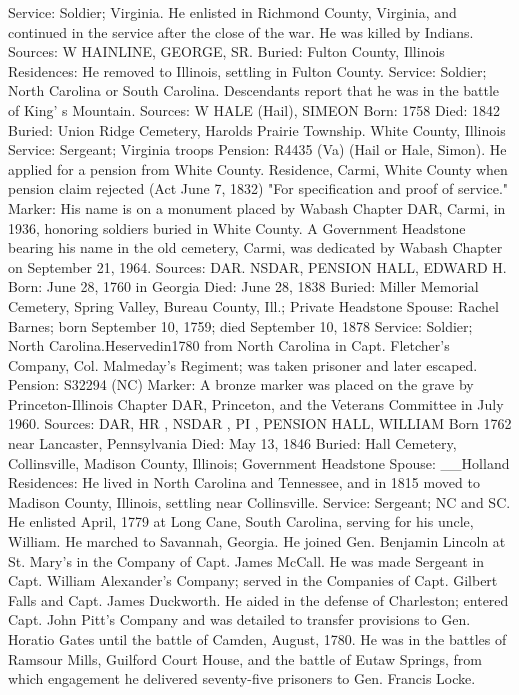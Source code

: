 Service: Soldier; Virginia. He enlisted in Richmond County, Virginia, and continued in the service after the close of the war. He was killed by Indians. 
Sources: W 
HAINLINE, GEORGE, SR. 
Buried: Fulton County, Illinois 
Residences: He removed to Illinois, settling in Fulton County. 
Service: Soldier; North Carolina or South Carolina. Descendants report that he was in the battle of King' s Mountain. 
Sources: W 
HALE (Hail), SIMEON 
Born: 1758 
Died: 1842 
Buried: Union Ridge Cemetery, Harolds Prairie Township. White County, Illinois 
Service: Sergeant; Virginia troops Pension: R4435 (Va) (Hail or Hale, Simon). He applied for a pension from White County. 
Residence, Carmi, White County when pension claim rejected (Act June 7, 1832) "For specification and proof of service." 
Marker: His name is on a monument placed by Wabash Chapter DAR, Carmi, in 1936, honoring soldiers buried in White County. A Government Headstone bearing his name in the old cemetery, Carmi, was dedicated by Wabash Chapter on September 21, 1964. 
Sources: DAR. NSDAR, PENSION 
HALL, EDWARD H. 
Born: June 28, 1760 in Georgia 
Died: June 28, 1838 
Buried: Miller Memorial Cemetery, Spring Valley, Bureau County, Ill.; Private Headstone 
Spouse: Rachel Barnes; born September 10, 1759; died September 10, 1878 
Service: Soldier; North Carolina.Heservedin1780 from North Carolina in Capt. Fletcher's Company, Col. Malmeday's Regiment; was taken prisoner and later escaped. 
Pension: S32294 (NC) 
Marker: A bronze marker was placed on the grave by Princeton-Illinois Chapter DAR, Princeton, and the Veterans Committee in July 1960. 
Sources: DAR, HR , NSDAR , PI , PENSION 
HALL, WILLIAM 
Born 1762 near Lancaster, Pennsylvania 
Died: May 13, 1846 
Buried: Hall Cemetery, Collinsville, Madison County, Illinois; Government Head­stone 
Spouse: __Holland 
Residences: He lived in North Carolina and Tennessee, and in 1815 moved to Madison County, Illinois, settling near Collinsville. 
Service: Sergeant; NC and SC. He enlisted April, 1779 at Long Cane, South Carolina, serving for his uncle, William. He marched to Savannah, Georgia. He joined Gen. Benjamin Lincoln at St. Mary's in the Company of Capt. James McCall. He was made Sergeant in Capt. William Alexander's Com­pany; served in the Companies of Capt. Gilbert Falls and Capt. James Duckworth. He aided in the defense of Charleston; entered Capt. John Pitt's Company and was detailed to transfer provisions to Gen. Horatio Gates until the battle of Camden, August, 1780. He was in the battles of Ramsour Mills, Guilford Court House, and the battle of Eutaw Springs, from which engagement he delivered seventy-five prisoners to Gen. Francis Locke. 
